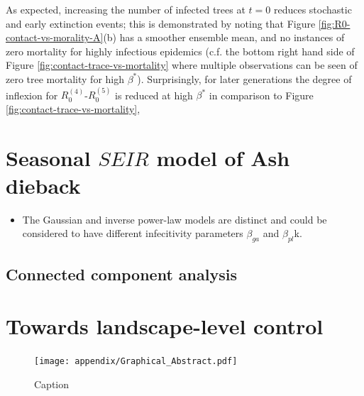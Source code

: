 As expected, increasing the number of infected trees at $t=0$ reduces stochastic and early extinction events;
this is demonstrated by noting that Figure \ref{fig:R0-contact-vs-morality-A}(b) has a smoother ensemble mean, and no instances of zero mortality for highly infectious epidemics (c.f. the bottom right hand side of Figure \ref{fig:contact-trace-vs-mortality} where multiple observations can be seen of zero tree mortality for high $\beta^*$).
Surprisingly, for later generations the degree of inflexion for $R_0^{(4)}$-$R_0^{(5)}$ is reduced at high $\beta^*$ in comparison to Figure \ref{fig:contact-trace-vs-mortality},

\newpage


\chapter{Seasonal $SEIR$ model of Ash dieback}

\label{section:ga-SEIR-variant}
\begin{itemize}
    \item The Gaussian and inverse power-law models are distinct and could be considered to have different infecitivity parameters $\beta_{ga}$ and $\beta_{pl}$k.
\end{itemize}

\section{Connected component analysis}

\blindtext

\blindtext


\chapter{Towards landscape-level control}

\blindtext

\blindtext

\begin{figure}
    \centering
    \texttt{[image: appendix/Graphical\_Abstract.pdf]}
    \caption{Caption}
    \label{fig:my_label}
\end{figure}




